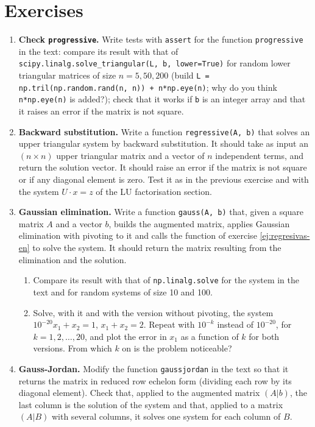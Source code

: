 \section{Exercises}
\begin{enumerate}
\item \label{ej:progresivas-en} \textbf{Check \texttt{progressive}.} Write tests with \texttt{assert} for the function \texttt{progressive} in the text: compare its result with that of \texttt{scipy.linalg.solve\_triangular(L, b, lower=True)} for random lower triangular matrices of size $n=5, 50, 200$ (build \texttt{L = np.tril(np.random.rand(n, n)) + n*np.eye(n)}; why do you think \texttt{n*np.eye(n)} is added?); check that it works if \texttt{b} is an integer array and that it raises an error if the matrix is not square.

\item \label{ej:regresivas-en} \textbf{Backward substitution.} Write a function \texttt{regressive(A, b)} that solves an upper triangular system by backward substitution. It should take as input an $(n\times n)$ upper triangular matrix and a vector of $n$ independent terms, and return the solution vector. It should raise an error if the matrix is not square or if any diagonal element is zero. Test it as in the previous exercise and with the system $U\cdot x = z$ of the LU factorisation section.

\item \label{ej:gauss-en} \textbf{Gaussian elimination.} Write a function \texttt{gauss(A, b)} that, given a square matrix $A$ and a vector $b$, builds the augmented matrix, applies Gaussian elimination with pivoting to it and calls the function of exercise \ref{ej:regresivas-en} to solve the system. It should return the matrix resulting from the elimination and the solution.
\begin{enumerate}
\item Compare its result with that of \texttt{np.linalg.solve} for the system in the text and for random systems of size 10 and 100.
\item Solve, with it and with the version without pivoting, the system $10^{-20}x_1+x_2=1$, $x_1+x_2=2$. Repeat with $10^{-k}$ instead of $10^{-20}$, for $k=1,2,\dots,20$, and plot the error in $x_1$ as a function of $k$ for both versions. From which $k$ on is the problem noticeable?
\end{enumerate}

\item \label{ej:gaussjordan-en} \textbf{Gauss-Jordan.} Modify the function \texttt{gaussjordan} in the text so that it returns the matrix in reduced row echelon form (dividing each row by its diagonal element). Check that, applied to the augmented matrix $(A\vert b)$, the last column is the solution of the system and that, applied to a matrix $(A\vert B)$ with several columns, it solves one system for each column of $B$.


\end{enumerate}
